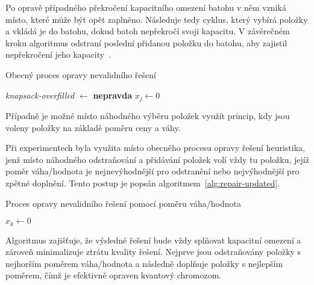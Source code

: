 Po opravě případného překročení kapacitního omezení batohu v něm vzniká místo, které může být opět zaplněno. 
Následuje tedy cyklus, který vybírá položky a vkládá je do batohu, dokud batoh nepřekročí svoji kapacitu. 
V závěrečném kroku algoritmus odstraní poslední přidanou položku do batohu, aby zajistil nepřekročení jeho kapacity~\cite{qiga}.
\begin{algorithm}[ht!]
    \caption{Obecný proces opravy nevalidního řešení}
    \label{alg:repair}
    \textit{knapsack-overfilled} $\gets$ \textbf{nepravda}\;
    $x_j \gets 0$\;
\end{algorithm}

Případně je možné místo náhodného výběru položek využít princip, kdy jsou voleny položky na základě poměru ceny a váhy. 

Při experimentech byla využita místo obecného procesu opravy řešení heuristika, jenž místo náhodného odstraňování a přidávání položek volí vždy tu položku, jejíž poměr váha/hodnota je nejnevýhodnější pro odstranění nebo nejvýhodnější pro zpětné doplnění. 
Tento postup je popsán algoritmem~\ref{alg:repair-updated}.
\begin{algorithm}[ht]
    \caption{Proces opravy nevalidního řešení pomocí poměru váha/hodnota}
    \label{alg:repair-updated}
    $x_k \gets 0$\;
    \;
\end{algorithm}
Algoritmus zajišťuje, že výsledné řešení bude vždy splňovat kapacitní omezení a zároveň minimalizuje ztrátu kvality řešení. 
Nejprve jsou odstraňovány položky s nejhorším poměrem váha/hodnota a následně doplňuje položky s nejlepším poměrem, čímž je efektivně opraven kvantový chromozom. 

